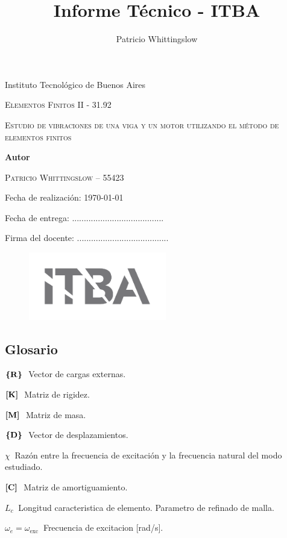 \documentclass[onecolumn,10pt,titlepage,a4paper]{article}
\title{Informe Técnico - ITBA}
\author{Patricio Whittingslow}
\newcommand{\glossentry}[2]{$#1\ $ \indent #2 \par \vspace{.4cm} }
\begin{document}
\begin{titlepage}
	\centering
	
	{ \large Instituto Tecnológico de Buenos Aires  \par }
	\vspace{2cm}
	{\Large \scshape Elementos Finitos II - 31.92 \par}
	\vspace{2cm}
	{\Huge \scshape Estudio de vibraciones de una viga y un motor utilizando el método de elementos finitos\par }
	\vspace{.5cm}
	{\Large  \par}
	\vspace{2cm}
	{\large \bf Autor \par}
	\vspace{.5cm}
	\textsc{\large Patricio Whittingslow -- 55423}
	\vspace{2cm}
	{\par \large Fecha de realización: \today \par}
	\vspace{1cm}
	{\large Fecha de entrega: .......................................\par}
	\vspace{\fill}
	{\large Firma del docente: .......................................}
	\vspace{\fill}
	\begin{figure}[htb!]
		\centering
		\includegraphics[width=6cm]{fig/logoitba.png}
	\end{figure}
\end{titlepage}




\begin{multicols}{2}
	\section*{Glosario}
	\glossentry{\Cme{R}}{Vector de cargas externas.}
	\glossentry{\Mme{K}}{Matriz de rigidez.}
	\glossentry{\Mme{M}}{Matriz de masa.}
	\glossentry{\Cme{D}}{Vector de desplazamientos.}
	\glossentry{\chi}{Razón entre la frecuencia de excitación y la frecuencia natural del modo estudiado.}
	\glossentry{\Mme{C}}{Matriz de amortiguamiento.}
	\glossentry{L_c}{Longitud caracteristica de elemento. Parametro de refinado de malla.}
	\glossentry{\omega_e=\omega_{\mathrm{exc}}}{Frecuencia de excitacion [rad/s].}
\end{multicols}
\end{document}
